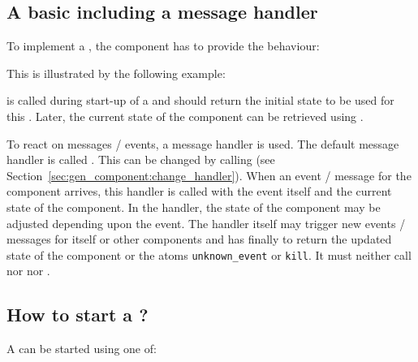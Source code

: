 \subsection{\texorpdfstring{A basic  including a message handler}
             {A basic gen\_component including a message handler}}

To implement a , the component has to provide the
 behaviour:


This is illustrated by the following example:


 is called during start-up of a
 and should return the initial state to be used
for this . Later, the current state of the
component can be retrieved using .

To react on messages / events, a message handler is used. The default
message handler is called . This can be
changed by calling  (see
Section~\ref{sec:gen_component:change_handler}). When an event / message for
the component arrives, this handler is called with the event itself and the
current state of the component. In the handler, the state of the component
may be adjusted depending upon the event. The handler itself may trigger new
events / messages for itself or other components and has finally to return
the updated state of the component or the atoms \texttt{unknown\_event} or
\texttt{kill}. It must neither call  nor
 nor .

\subsection{\texorpdfstring{How to start a ?}
             {How to start a gen\_component?}}

A  can be started using one of:

